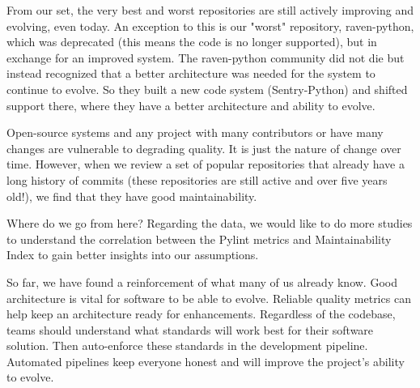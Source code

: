 

From our set, the very best and worst repositories are still actively improving and evolving, even today. An exception to this is our "worst" repository, raven-python, which was deprecated (this means the code is no longer supported), but in exchange for an improved system. The raven-python community did not die but instead recognized that a better architecture was needed for the system to continue to evolve. So they built a new code system (Sentry-Python) and shifted support there, where they have a better architecture and ability to evolve.

Open-source systems and any project with many contributors or have many changes are vulnerable to degrading quality. It is just the nature of change over time. However, when we review a set of popular repositories that already have a long history of commits (these repositories are still active and over five years old!), we find that they have good maintainability.

Where do we go from here? Regarding the data, we would like to do more studies to understand the correlation between the Pylint metrics and Maintainability Index to gain better insights into our assumptions.

So far, we have found a reinforcement of what many of us already know. Good architecture is vital for software to be able to evolve. Reliable quality metrics can help keep an architecture ready for enhancements. Regardless of the codebase, teams should understand what standards will work best for their software solution. Then auto-enforce these standards in the development pipeline. Automated pipelines keep everyone honest and will improve the project's ability to evolve.

